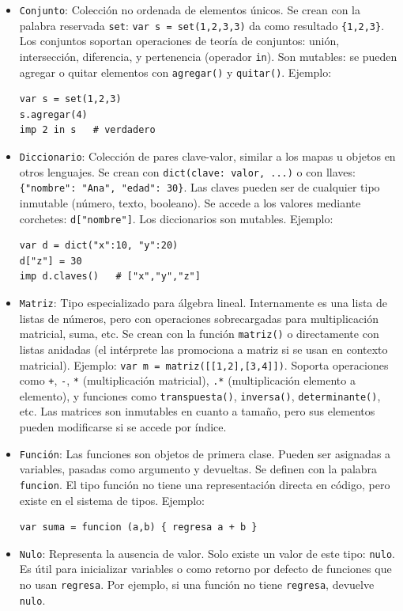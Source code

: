 \documentclass[12pt]{article}
\begin{document}
\begin{itemize}
    \item \texttt{Conjunto}: Colección no ordenada de elementos únicos. Se crean con la palabra reservada \texttt{set}: \texttt{var s = set(1,2,3,3)} da como resultado \texttt{\{1,2,3\}}. Los conjuntos soportan operaciones de teoría de conjuntos: unión, intersección, diferencia, y pertenencia (operador \texttt{in}). Son mutables: se pueden agregar o quitar elementos con \texttt{agregar()} y \texttt{quitar()}. Ejemplo:
    \begin{lstlisting}
var s = set(1,2,3)
s.agregar(4)
imp 2 in s   # verdadero
    \end{lstlisting}

    \item \texttt{Diccionario}: Colección de pares clave-valor, similar a los mapas u objetos en otros lenguajes. Se crean con \texttt{dict(clave: valor, ...)} o con llaves: \texttt{\{"nombre": "Ana", "edad": 30\}}. Las claves pueden ser de cualquier tipo inmutable (número, texto, booleano). Se accede a los valores mediante corchetes: \texttt{d["nombre"]}. Los diccionarios son mutables. Ejemplo:
    \begin{lstlisting}
var d = dict("x":10, "y":20)
d["z"] = 30
imp d.claves()   # ["x","y","z"]
    \end{lstlisting}

    \item \texttt{Matriz}: Tipo especializado para álgebra lineal. Internamente es una lista de listas de números, pero con operaciones sobrecargadas para multiplicación matricial, suma, etc. Se crean con la función \texttt{matriz()} o directamente con listas anidadas (el intérprete las promociona a matriz si se usan en contexto matricial). Ejemplo: \texttt{var m = matriz([[1,2],[3,4]])}. Soporta operaciones como \texttt{+}, \texttt{-}, \texttt{*} (multiplicación matricial), \texttt{.*} (multiplicación elemento a elemento), y funciones como \texttt{transpuesta()}, \texttt{inversa()}, \texttt{determinante()}, etc. Las matrices son inmutables en cuanto a tamaño, pero sus elementos pueden modificarse si se accede por índice.

    \item \texttt{Función}: Las funciones son objetos de primera clase. Pueden ser asignadas a variables, pasadas como argumento y devueltas. Se definen con la palabra \texttt{funcion}. El tipo función no tiene una representación directa en código, pero existe en el sistema de tipos. Ejemplo:
    \begin{lstlisting}
var suma = funcion (a,b) { regresa a + b }
    \end{lstlisting}

    \item \texttt{Nulo}: Representa la ausencia de valor. Solo existe un valor de este tipo: \texttt{nulo}. Es útil para inicializar variables o como retorno por defecto de funciones que no usan \texttt{regresa}. Por ejemplo, si una función no tiene \texttt{regresa}, devuelve \texttt{nulo}.
\end{itemize}
\end{document}
